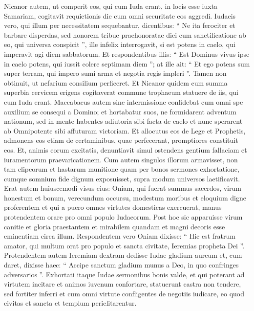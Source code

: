 \begin{biblechapter}
\begin{biblechapter}
\begin{biblechapter}
\begin{biblechapter}
\begin{biblechapter}
\begin{biblechapter}
\begin{biblechapter}
\begin{biblechapter}
\begin{biblechapter}
\begin{biblechapter}
\begin{biblechapter}
\begin{biblechapter}
\begin{biblechapter}
\begin{biblechapter}
\begin{biblechapter}
\verse Nicanor autem, ut comperit eos, qui cum Iuda erant, in locis esse iuxta Samariam, cogitavit requietionis die cum omni securitate eos aggredi. 
\verse Iudaeis vero, qui illum per necessitatem sequebantur, dicentibus: “ Ne ita ferociter et barbare disperdas, sed honorem tribue praehonoratae diei cum sanctificatione ab eo, qui universa conspicit ”, 
\verse ille infelix interrogavit, si est potens in caelo, qui imperavit agi diem sabbatorum. 
\verse Et respondentibus illis: “ Est Dominus vivus ipse in caelo potens, qui iussit colere septimam diem ”; 
\verse at ille ait: “ Et ego potens sum super terram, qui impero sumi arma et negotia regis impleri ”. Tamen non obtinuit, ut nefarium consilium perficeret.
 \verse Et Nicanor quidem cum summa superbia cervicem erigens cogitaverat commune trophaeum statuere de iis, qui cum Iuda erant. 
\verse Maccabaeus autem sine intermissione confidebat cum omni spe auxilium se consequi a Domino; 
\verse et hortabatur suos, ne formidarent adventum nationum, sed in mente habentes adiutoria sibi facta de caelo et nunc sperarent ab Omnipotente sibi affuturam victoriam. 
\verse Et allocutus eos de Lege et Prophetis, admonens eos etiam de certaminibus, quae perfecerant, promptiores constituit eos. 
\verse Et, animis eorum excitatis, denuntiavit simul ostendens gentium fallaciam et iuramentorum praevaricationem. 
\verse Cum autem singulos illorum armavisset, non tam clipeorum et hastarum munitione quam per bonos sermones exhortatione, cumque somnium fide dignum exposuisset, supra modum universos laetificavit.
 \verse Erat autem huiuscemodi visus eius: Oniam, qui fuerat summus sacerdos, virum honestum et bonum, verecundum occursu, modestum moribus et eloquium digne proferentem et qui a puero omnes virtutes domesticas exercuerat, manus protendentem orare pro omni populo Iudaeorum. 
\verse Post hoc sic apparuisse virum canitie et gloria praestantem et mirabilem quandam et magni decoris esse eminentiam circa illum. 
\verse Respondentem vero Oniam dixisse: “ Hic est fratrum amator, qui multum orat pro populo et sancta civitate, Ieremias propheta Dei ”. 
\verse Protendentem autem Ieremiam dextram dedisse Iudae gladium aureum et, cum daret, dixisse haec: 
\verse “ Accipe sanctum gladium munus a Deo, in quo confringes adversarios ”.
 \verse Exhortati itaque Iudae sermonibus bonis valde, et qui poterant ad virtutem incitare et animos iuvenum confortare, statuerunt castra non tendere, sed fortiter inferri et cum omni virtute confligentes de negotiis iudicare, eo quod civitas et sancta et templum periclitarentur. 

\end{biblechapter}
\end{biblechapter}
\end{biblechapter}
\end{biblechapter}
\end{biblechapter}
\end{biblechapter}
\end{biblechapter}
\end{biblechapter}
\end{biblechapter}
\end{biblechapter}
\end{biblechapter}
\end{biblechapter}
\end{biblechapter}
\end{biblechapter}
\end{biblechapter}
